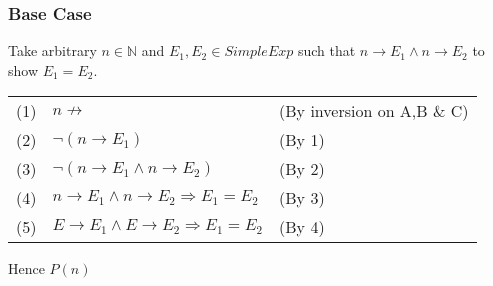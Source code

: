 \documentclass{report}
\begin{document}
\subsubsection*{Base Case}
Take arbitrary $n \in \mathbb{N}$ and $E_1,E_2 \in SimpleExp$ such that $n \to E_1 \land n \to E_2$ to show $E_1 = E_2$.
\begin{center}
	\begin{tabular}{l l l}
		(1) & $n \not\to$                                       & (By inversion on A,B \& C) \\
		(2) & $\neg (n \to E_1)$                                & (By 1)                     \\
		(3) & $\neg (n \to E_1 \land n \to E_2)$                & (By 2)                     \\
		(4) & $n \to E_1 \land n \to E_2 \Rightarrow E_1 = E_2$ & (By 3)                     \\
		(5) & $E \to E_1 \land E \to E_2 \Rightarrow E_1 = E_2$ & (By 4)                     \\
	\end{tabular}
\end{center}
Hence $P(n)$
\end{document}
